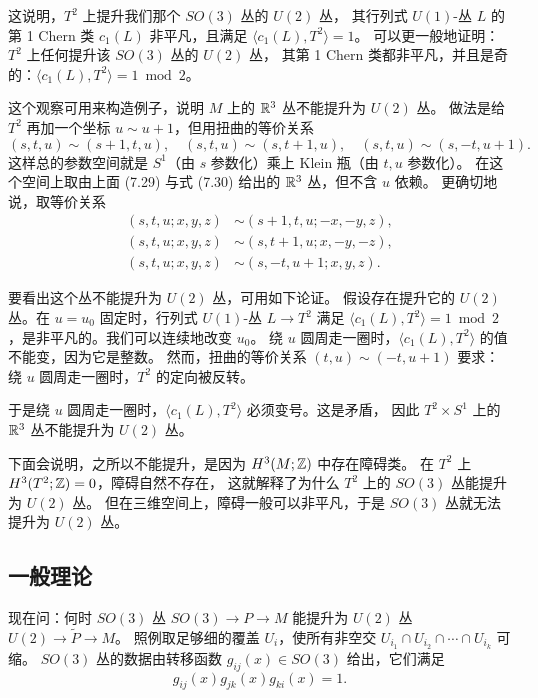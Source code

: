 这说明，$T^2$ 上提升我们那个 $SO(3)$ 丛的 $U(2)$ 丛，
其行列式 $U(1)$-丛 $L$ 的第 1 Chern 类 $c_1(L)$ 非平凡，且满足 $\langle c_1(L),T^2\rangle=1$。
可以更一般地证明：$T^2$ 上任何提升该 $SO(3)$ 丛的 $U(2)$ 丛，
其第 1 Chern 类都非平凡，并且是奇的：$\langle c_1(L),T^2\rangle=1\bmod 2$。

这个观察可用来构造例子，说明 $M$ 上的 $\mathbb{R}^3$ 丛不能提升为 $U(2)$ 丛。
做法是给 $T^2$ 再加一个坐标 $u\sim u+1$，但用扭曲的等价关系
\begin{equation}
(s,t,u)\sim(s+1,t,u),\quad
(s,t,u)\sim(s,t+1,u),\quad
(s,t,u)\sim(s,-t,u+1).
\tag{7.46}
\end{equation}
这样总的参数空间就是 $S^1$（由 $s$ 参数化）乘上 Klein 瓶（由 $t,u$ 参数化）。
在这个空间上取由上面 (7.29) 与式 (7.30) 给出的 $\mathbb{R}^3$ 丛，但不含 $u$ 依赖。
更确切地说，取等价关系
\begin{align}
(s,t,u;x,y,z)&\sim(s+1,t,u;-x,-y,z), \tag{7.47}\\
(s,t,u;x,y,z)&\sim(s,t+1,u;x,-y,-z), \tag{7.48}\\
(s,t,u;x,y,z)&\sim(s,-t,u+1;x,y,z). \tag{7.49}
\end{align}

要看出这个丛不能提升为 $U(2)$ 丛，可用如下论证。
假设存在提升它的 $U(2)$ 丛。在 $u=u_0$ 固定时，行列式 $U(1)$-丛 $L\to T^2$ 满足
$\langle c_1(L),T^2\rangle=1\bmod 2$，是非平凡的。我们可以连续地改变 $u_0$。
绕 $u$ 圆周走一圈时，$\langle c_1(L),T^2\rangle$ 的值不能变，因为它是整数。
然而，扭曲的等价关系 $(t,u)\sim(-t,u+1)$ 要求：绕 $u$ 圆周走一圈时，$T^2$ 的定向被反转。

于是绕 $u$ 圆周走一圈时，$\langle c_1(L),T^2\rangle$ 必须变号。这是矛盾，
因此 $T^2\times S^1$ 上的 $\mathbb{R}^3$ 丛不能提升为 $U(2)$ 丛。

下面会说明，之所以不能提升，是因为 $H^3(M;\mathbb{Z})$ 中存在障碍类。
在 $T^2$ 上 $H^3(T^2;\mathbb{Z})=0$，障碍自然不存在，
这就解释了为什么 $T^2$ 上的 $SO(3)$ 丛能提升为 $U(2)$ 丛。
但在三维空间上，障碍一般可以非平凡，于是 $SO(3)$ 丛就无法提升为 $U(2)$ 丛。

\subsection{一般理论}

现在问：何时 $SO(3)$ 丛 $SO(3)\to P\to M$ 能提升为 $U(2)$ 丛 $U(2)\to\tilde P\to M$。
照例取足够细的覆盖 $U_i$，使所有非空交 $U_{i_1}\cap U_{i_2}\cap\cdots\cap U_{i_k}$ 可缩。
$SO(3)$ 丛的数据由转移函数 $g_{ij}(x)\in SO(3)$ 给出，它们满足
\begin{equation}
g_{ij}(x)g_{jk}(x)g_{ki}(x)=1.
\tag{7.50}
\end{equation}

